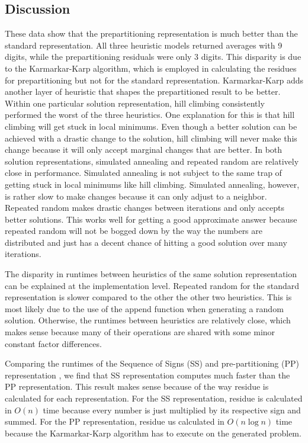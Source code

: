\documentclass[a4paper]{article}
\begin{document}
	\subsection{Discussion}
	These data show that the prepartitioning representation is much better than the standard representation. All three heuristic models returned averages with 9 digits, while the prepartitioning residuals were only 3 digits. This disparity is due to the Karmarkar-Karp algorithm, which is employed in calculating the residues for prepartitioning but not for the standard representation. Karmarkar-Karp adds another layer of heuristic that shapes the prepartitioned result to be better. Within one particular solution representation, hill climbing consistently performed the worst of the three heuristics. One explanation for this is that hill climbing will get stuck in local minimums. Even though a better solution can be achieved with a drastic change to the solution, hill climbing will never make this change because it will only accept marginal changes that are better. In both solution representations, simulated annealing and repeated random are relatively close in performance. Simulated annealing is not subject to the same trap of getting stuck in local minimums like hill climbing. Simulated annealing, however, is rather slow to make changes because it can only adjust to a neighbor. Repeated random makes drastic changes between iterations and only accepts better solutions. This works well for getting a good approximate answer because repeated random will not be bogged down by the way the numbers are distributed and just has a decent chance of hitting a good solution over many iterations. 
	
	The disparity in runtimes between heuristics of the same solution representation can be explained at the implementation level. Repeated random for the standard representation is slower compared to the other the other two heuristics. This is most likely due to the use of the append function when generating a random solution. Otherwise, the runtimes between heuristics are relatively close, which makes sense because many of their operations are shared with some minor constant factor differences.
	
	Comparing the runtimes of the Sequence of Signs (SS) and pre-partitioning (PP) representation , we find that SS representation computes much faster than the PP representation. This result makes sense because of the way residue is calculated for each representation. For the SS representation, residue is calculated in $O(n)$ time because every number is just multiplied by its respective sign and summed. For the PP representation, residue us calculated in $O(n\log n)$ time because the Karmarkar-Karp algorithm has to execute on the generated problem.
	
\end{document}
